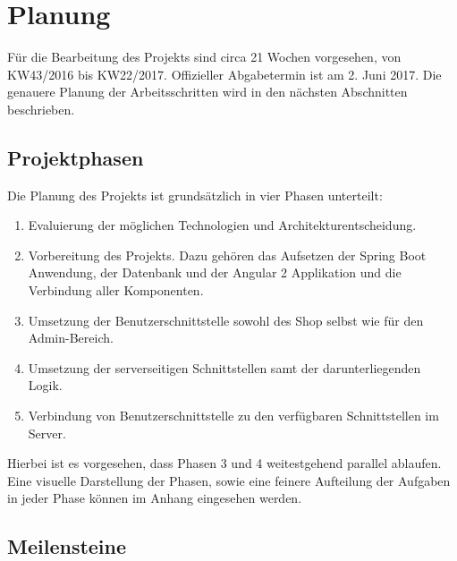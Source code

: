 \section{Planung}
Für die Bearbeitung des Projekts sind circa 21 Wochen vorgesehen, von KW43/2016 bis KW22/2017. Offizieller Abgabetermin ist am 2. Juni 2017. Die genauere Planung der Arbeitsschritten wird in den nächsten Abschnitten beschrieben.

\subsection{Projektphasen}
Die Planung des Projekts ist grundsätzlich in vier Phasen unterteilt:
\begin{enumerate}
	\item Evaluierung der möglichen Technologien und Architekturentscheidung.
	\item Vorbereitung des Projekts. Dazu gehören das Aufsetzen der Spring Boot Anwendung, der Datenbank und der Angular 2 Applikation und die Verbindung aller Komponenten.
	\item Umsetzung der  Benutzerschnittstelle sowohl des Shop selbst wie für den Admin-Bereich.
	\item Umsetzung der serverseitigen Schnittstellen samt der darunterliegenden Logik.
	\item Verbindung von Benutzerschnittstelle zu den verfügbaren Schnittstellen im Server.
\end{enumerate}

Hierbei ist es vorgesehen, dass Phasen 3 und 4 weitestgehend parallel ablaufen. Eine visuelle Darstellung der Phasen, sowie eine feinere Aufteilung der Aufgaben in jeder Phase können im Anhang eingesehen werden.

\subsection{Meilensteine}
